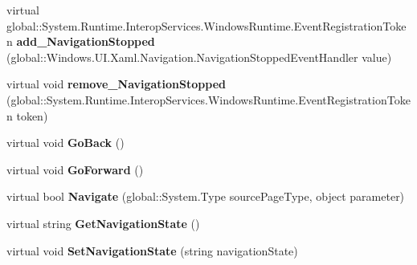 \begin{DoxyCompactItemize}
\item 
\mbox{\label{class_windows_1_1_u_i_1_1_xaml_1_1_controls_1_1_frame_a6bf2da59d0a90e490aecaa3f355783ac}} 
virtual global\+::\+System.\+Runtime.\+Interop\+Services.\+Windows\+Runtime.\+Event\+Registration\+Token {\bfseries add\+\_\+\+Navigation\+Stopped} (global\+::\+Windows.\+U\+I.\+Xaml.\+Navigation.\+Navigation\+Stopped\+Event\+Handler value)
\item 
\mbox{\label{class_windows_1_1_u_i_1_1_xaml_1_1_controls_1_1_frame_a18e9954aafd2a9225401b40871f4f115}} 
virtual void {\bfseries remove\+\_\+\+Navigation\+Stopped} (global\+::\+System.\+Runtime.\+Interop\+Services.\+Windows\+Runtime.\+Event\+Registration\+Token token)
\item 
\mbox{\label{class_windows_1_1_u_i_1_1_xaml_1_1_controls_1_1_frame_aa208a306e405ff8aad9dc0a19d722b18}} 
virtual void {\bfseries Go\+Back} ()
\item 
\mbox{\label{class_windows_1_1_u_i_1_1_xaml_1_1_controls_1_1_frame_a77897d1c6e165763d79d0444353627b6}} 
virtual void {\bfseries Go\+Forward} ()
\item 
\mbox{\label{class_windows_1_1_u_i_1_1_xaml_1_1_controls_1_1_frame_aa88f5dbc5d0be1aa7a6d29db649b5d3b}} 
virtual bool {\bfseries Navigate} (global\+::\+System.\+Type source\+Page\+Type, object parameter)
\item 
\mbox{\label{class_windows_1_1_u_i_1_1_xaml_1_1_controls_1_1_frame_a61a9544723df665a3302a9c9787d26e5}} 
virtual string {\bfseries Get\+Navigation\+State} ()
\item 
\mbox{\label{class_windows_1_1_u_i_1_1_xaml_1_1_controls_1_1_frame_ad11b0d06a73306aa6bdb716ba217bf42}} 
virtual void {\bfseries Set\+Navigation\+State} (string navigation\+State)
\item 
\mbox{\label{class_windows_1_1_u_i_1_1_xaml_1_1_controls_1_1_frame_a1ba0f46855026734880083781db1286b}} 

\end{DoxyCompactItemize}
